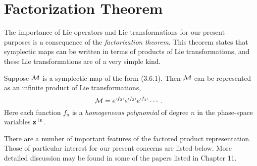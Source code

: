 \section{Factorization Theorem}
\label{factorization}
     The importance of Lie operators and Lie transformations for our
present purposes is a consequence of the {\em factorization theorem}.  This
theorem states that symplectic maps can be written in terms of products of
Lie transformations, and these Lie transformations are of a very simple
kind.

     Suppose ${\cal M}$ is a symplectic map of the form (3.6.1).  Then ${\cal M}$ can be
represented as an infinite product of Lie transformations,
\begin{equation}
      {\cal M} = e^{:f_2:} e^{:f_3:} e^{:f_4:} \cdots.
\end{equation}
Here each function $f_n$ is a {\em homogeneous polynomial} of degree
$n$ in the phase-space variables ${\bf z}^{\mbox{\scriptsize \ in}}$.

     There are a number of important features of the factored product
representation.  Those of particular interest for our present concerns are
listed below.  More detailed discussion may be found in some of the papers
listed in Chapter 11.

